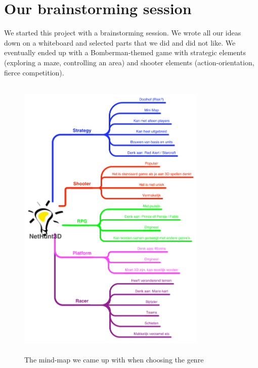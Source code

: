 
\section{Our brainstorming session}

We started this project with a brainstorming session. We wrote all our ideas down on a whiteboard and selected parts that we did and did not like. We eventually ended up with a Bomberman-themed game with strategic elements (exploring a maze, controlling an area) and shooter elements (action-orientation, fierce competition).

\begin{figure}[!ht]
  \centering
\includegraphics[width=9cm,height=14cm]{diagrams/mindmap1}
  \caption{The mind-map we came up with when choosing the genre} \label{fig:mindmap1}
\end{figure}

